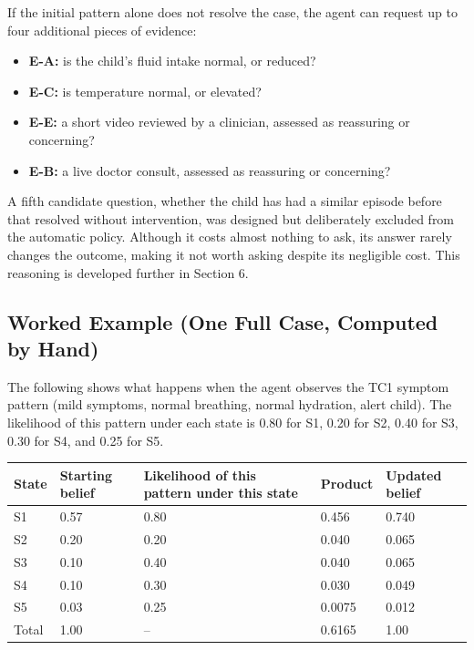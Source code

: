\documentclass{article}
\begin{document}
If the initial pattern alone does not resolve the case, the agent can
request up to four additional pieces of evidence:

\begin{itemize}
\tightlist
\item
  \textbf{E-A:} is the child's fluid intake normal, or reduced?
\item
  \textbf{E-C:} is temperature normal, or elevated?
\item
  \textbf{E-E:} a short video reviewed by a clinician, assessed as
  reassuring or concerning?
\item
  \textbf{E-B:} a live doctor consult, assessed as reassuring or
  concerning?
\end{itemize}

A fifth candidate question, whether the child has had a similar episode
before that resolved without intervention, was designed but deliberately
excluded from the automatic policy. Although it costs almost nothing to
ask, its answer rarely changes the outcome, making it not worth asking
despite its negligible cost. This reasoning is developed further in
Section 6.

\hypertarget{worked-example-one-full-case-computed-by-hand}{%
\subsection{Worked Example (One Full Case, Computed by
Hand)}\label{worked-example-one-full-case-computed-by-hand}}

The following shows what happens when the agent observes the TC1 symptom
pattern (mild symptoms, normal breathing, normal hydration, alert
child). The likelihood of this pattern under each state is 0.80 for S1,
0.20 for S2, 0.40 for S3, 0.30 for S4, and 0.25 for S5.

\begin{table}[t]
\centering\small
\begin{tabular}{@{}p{}p{}p{}p{}p{}@{}}
\toprule
\textbf{State} & \textbf{Starting belief} & \textbf{Likelihood of this pattern under this state} & \textbf{Product} & \textbf{Updated belief} \\
\midrule
S1 & 0.57 & 0.80 & 0.456 & 0.740 \\
S2 & 0.20 & 0.20 & 0.040 & 0.065 \\
S3 & 0.10 & 0.40 & 0.040 & 0.065 \\
S4 & 0.10 & 0.30 & 0.030 & 0.049 \\
S5 & 0.03 & 0.25 & 0.0075 & 0.012 \\
Total & 1.00 & -- & 0.6165 & 1.00 \\
\bottomrule
\end{tabular}
\end{table}
\end{document}
